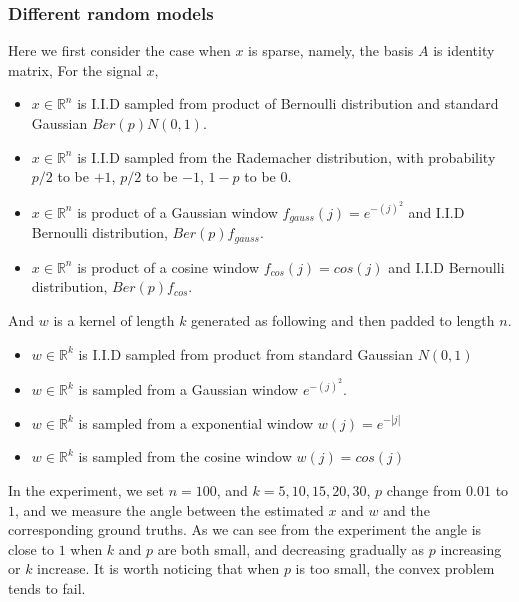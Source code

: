 \documentclass[letter, 10pt]{article}
\numberwithin{equation}{section}
\begin{document}
\subsubsection{Different random models}
Here we first consider the case when $x$ is sparse, namely, the basis $A$ is identity matrix, For the signal $x$,
\begin{itemize}
\item $x\in \mathbb{R}^n$ is I.I.D sampled from product of Bernoulli distribution and standard Gaussian $Ber(p)N(0,1)$.
\item $x\in \mathbb{R}^n$ is I.I.D sampled from the Rademacher distribution, with probability $p/2$ to be $+1$, $p/2$ to be $-1$, $1-p$ to be $0$.
\item $x\in \mathbb{R}^n$ is product of a Gaussian window $f_{gauss}(j) = e^{-(j)^2}$ and I.I.D Bernoulli distribution, $Ber(p)f_{gauss}$.
\item $x\in \mathbb{R}^n$ is product of a cosine window $f_{cos}(j) = cos(j)$ and I.I.D Bernoulli distribution, $Ber(p)f_{cos}$.
\end{itemize}
And $w$ is a kernel of length $k$ generated as following and then padded to length $n$. 
\begin{itemize}
\item $w\in \mathbb{R}^k$ is I.I.D sampled from product from standard Gaussian $N(0,1)$
\item $w\in \mathbb{R}^k$ is sampled from a Gaussian window $e^{-(j)^2}$.
\item $w\in \mathbb{R}^k$ is sampled from a exponential window $w(j) = e^{-|j|}$
\item $w\in \mathbb{R}^k$ is sampled from the cosine window $w(j) = cos(j)$
\end{itemize}

In the experiment, we set $n=100$, and $k= 5, 10, 15, 20, 30$, $p$ change from $0.01$ to $1$, and we measure the angle between the estimated $x$ and $w$ and the corresponding ground truths. As we can see from the experiment the angle is close to $1$ when $k$ and $p$ are both small, and decreasing gradually as $p$ increasing or $k$ increase. It is worth noticing that when $p$ is too small, the convex problem tends to fail.
\end{document}
